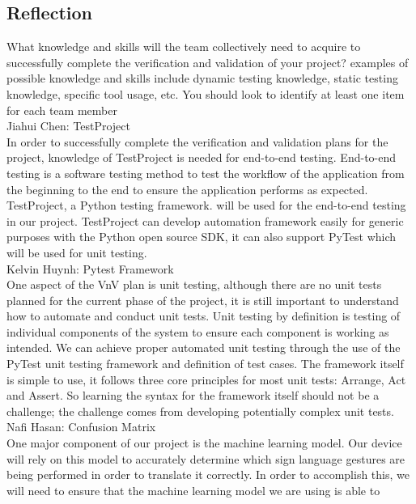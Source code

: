 \documentclass[12pt]{article}
\begin{document}
\subsection{Reflection}
\begin{outline}[enumerate]
  \1 What knowledge and skills will the team collectively need to acquire to successfully complete the verification and validation of your project?
  examples of possible knowledge and skills include dynamic testing knowledge, static testing knowledge, specific tool usage, etc. You should look to
  identify at least one item for each team member\\
    \2 Jiahui Chen: TestProject\\
    In order to successfully complete the verification and validation plans for the project, knowledge of TestProject is needed for end-to-end testing. End-to-end testing 
    is a software testing method to test the workflow of the application from the beginning to the end to ensure the application performs as expected. TestProject, a Python 
    testing framework. will be used for the end-to-end testing in our project. TestProject can develop automation framework easily for generic purposes with the Python open 
    source SDK, it can also support PyTest which will be used for unit testing.\\
    \2 Kelvin Huynh: Pytest Framework\\
    One aspect of the VnV plan is unit testing, although there are no unit tests planned for the current phase of the project, it is still important to understand how to 
    automate and conduct unit tests. Unit testing by definition is testing of individual components of the system to ensure each component is working as intended. We can 
    achieve proper automated unit testing through the use of the PyTest unit testing framework and definition of test cases. The framework itself is simple to use, it follows 
    three core principles for most unit tests: Arrange, Act and Assert. So learning the syntax for the framework itself should not be a challenge; the challenge comes from 
    developing potentially complex unit tests.\\
    \2 Nafi Hasan: Confusion Matrix\\
One major component of our project is the machine learning model. Our device will rely on this model to accurately determine which sign language gestures are
being performed in order to translate it correctly. In order to accomplish this, we will need to ensure that the machine learning model we are using is able to 

\end{outline}
\end{document}
